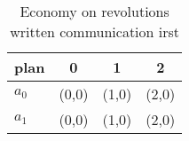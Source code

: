 \documentclass[a4paper]{article}
\begin{document}
\begin{table}
\begin{adjustbox}{width=0.6\columnwidth}
\begin{tabular}{|l|l|l|l|}
\hline
\textbf{plan} & \multicolumn{1}{c|}{\textbf{0}} & \multicolumn{1}{c|}{\textbf{1}} & \multicolumn{1}{c|}{\textbf{2}} \\ \hline
\textbf{$a_0$}  & (0,0) & (1,0) & (2,0) \\ \hline
\textbf{$a_1$}  & (0,0) & (1,0) & (2,0) \\ \hline
\end{tabular}
\end{adjustbox}
\caption{Economy on revolutions written communication irst
}
\end{table}
\end{document}
